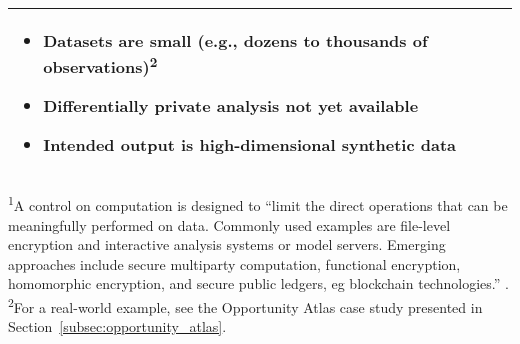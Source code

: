 \begin{center}
\begin{table}[H]
\begin{tabularx}{1\textwidth}{YYY}
\begin{itemize}
    \item Datasets are small (e.g., dozens to thousands of observations)\textsuperscript{2}
    \item Differentially private analysis not yet available
    \item Intended output is high-dimensional synthetic data
\end{itemize}
\\
\bottomrule
\end{tabularx}
\vspace{1pt}
\raggedright
{\fontsize{8}{9}\selectfont \textsuperscript{1}A control on computation is designed to ``limit the direct operations that can be meaningfully performed on data. Commonly used examples are file-level encryption and interactive analysis systems or model servers. Emerging approaches include secure multiparty computation, functional encryption, homomorphic encryption, and secure public ledgers, eg blockchain technologies.'' \citep{AltmanPracticalApproaches}.\\
\textsuperscript{2}For a real-world example, see the Opportunity Atlas case study presented in Section~\ref{subsec:opportunity_atlas}.}
\end{table}
\end{center}